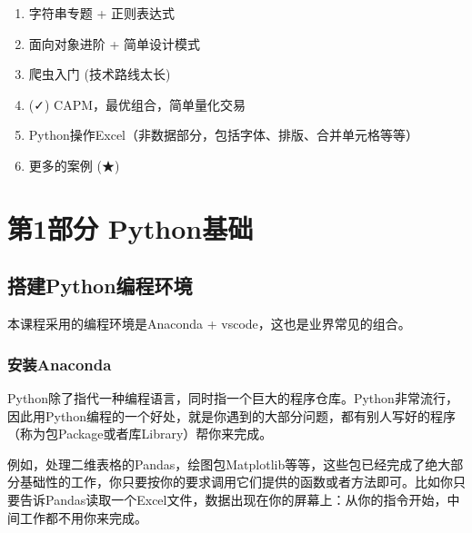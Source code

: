 \documentclass[
  letterpaper,
  DIV=11,
  numbers=noendperiod]{scrreprt}
\providecommand{\tightlist}{%
  \setlength{\itemsep}{0pt}\setlength{\parskip}{0pt}}\usepackage{longtable,booktabs,array}
\begin{document}
\begin{tcolorbox}[enhanced jigsaw, opacityback=0, left=2mm, coltitle=black, leftrule=.75mm, bottomtitle=1mm, arc=.35mm, opacitybacktitle=0.6, bottomrule=.15mm, breakable, colbacktitle=quarto-callout-warning-color!10!white, toprule=.15mm, toptitle=1mm, colframe=quarto-callout-warning-color-frame, titlerule=0mm, title=\textcolor{quarto-callout-warning-color}{\faExclamationTriangle}\hspace{0.5em}{Warning}, rightrule=.15mm, colback=white]

\begin{enumerate}
\def\labelenumi{\arabic{enumi}.}
\tightlist
\item
  字符串专题 + 正则表达式
\item
  面向对象进阶 + 简单设计模式
\item
  爬虫入门 (技术路线太长)
\item
  (✓) CAPM，最优组合，简单量化交易
\item
  Python操作Excel（非数据部分，包括字体、排版、合并单元格等等）
\item
  更多的案例 (★)
\end{enumerate}

\end{tcolorbox}

\part{第1部分 Python基础}

\hypertarget{ux642dux5efapythonux7f16ux7a0bux73afux5883}{%
\chapter{搭建Python编程环境}\label{ux642dux5efapythonux7f16ux7a0bux73afux5883}}

本课程采用的编程环境是Anaconda + vscode，这也是业界常见的组合。

\hypertarget{ux5b89ux88c5anaconda}{%
\section{安装Anaconda}\label{ux5b89ux88c5anaconda}}

Python除了指代一种编程语言，同时指一个巨大的程序仓库。Python非常流行，因此用Python编程的一个好处，就是你遇到的大部分问题，都有别人写好的程序（称为包Package或者库Library）帮你来完成。

例如，处理二维表格的Pandas，绘图包Matplotlib等等，这些包已经完成了绝大部分基础性的工作，你只要按你的要求调用它们提供的函数或者方法即可。比如你只要告诉Pandas读取一个Excel文件，数据出现在你的屏幕上：从你的指令开始，中间工作都不用你来完成。
\end{document}
